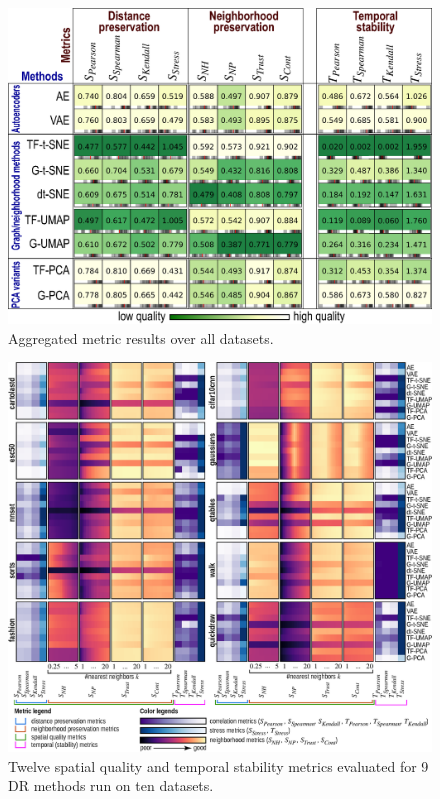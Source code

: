 \begin{figure}[tb]\centering
  \includegraphics[width=.95\linewidth]{figures/projection-evaluation/aggregate_matrix.eps}
  \caption{Aggregated metric results over all datasets.}
  \label{fig:aggregated}
\end{figure}

\begin{figure}[tb]\centering
  \vspace{-0.2cm}
  \includegraphics[width=\linewidth]{figures/projection-evaluation/f2.eps}
  \caption{Twelve spatial quality and temporal stability metrics evaluated for 9 DR  methods run on ten datasets.}
  \vspace{-0.2cm}
  \label{fig:all_datasets}
\end{figure}


